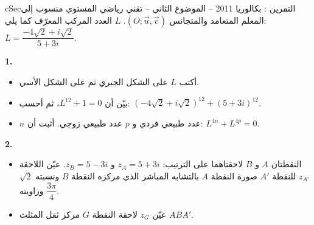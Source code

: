\documentclass[12pt,a4paper]{article}
\newenvironment{BOX}[2]{\begin{otherlanguage}{english}\begin{arbox}{#1}{#2}}{\end{arbox}\end{otherlanguage}}
\newcounter{exo}
\newenvironment{tamrin}[1]{\stepcounter{exo}\begin{BOX}{cSec}{التمرين \theexo: #1}}{\end{BOX}}
\newenvironment{sq}{\begin{itemize}[leftmargin=2.4em,itemsep=3pt]}{\end{itemize}}
\newcommand{\qa}{\item[(أ)]}\newcommand{\qb}{\item[(ب)]}\newcommand{\qc}{\item[(جـ)]}\newcommand{\qd}{\item[(د)]}\newcommand{\qe}{\item[(هـ)]}
\newcommand{\QQ}[1]{\par\smallskip\textbf{#1.} }
\begin{document}
\begin{tamrin}{بكالوريا 2011 -- الموضوع الثاني -- تقني رياضي}
المستوي منسوب إلى المعلم المتعامد والمتجانس $(O;\vec u,\vec v)$. $L$ العدد المركب المعرّف كما يلي: $L=\dfrac{-4\sqrt2+i\sqrt2}{5+3i}$.
\QQ{1}
\begin{sq}
\qa أكتب $L$ على الشكل الجبري ثم على الشكل الأسي.
\qb بيّن أن $L^{12}+1=0$، ثم أحسب: $(-4\sqrt2+i\sqrt2)^{12}+(5+3i)^{12}$.
\qc $n$ عدد طبيعي فردي و $p$ عدد طبيعي زوجي. أثبت أن: $L^{4n}+L^{4p}=0$.
\end{sq}
\QQ{2}
\begin{sq}
\qa النقطتان $A$ و $B$ لاحقتاهما على الترتيب: $z_A=5+3i$ و $z_B=5-3i$.
عيّن اللاحقة $z_{A'}$ للنقطة $A'$ صورة النقطة $A$ بالتشابه المباشر الذي مركزه النقطة $B$ ونسبته $\sqrt2$ وزاويته $\dfrac{3\pi}{4}$.
\qb عيّن $z_G$ لاحقة النقطة $G$ مركز ثقل المثلث $ABA'$.
\end{sq}
\end{tamrin}
\end{document}
